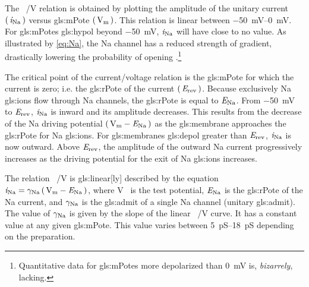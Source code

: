 \documentclass[class={myRUCProject}, crop=false]{standalone}
\begin{document}
The \unit[per-mode = symbol]{\ucur\sodium\per\V} relation is obtained by plotting the amplitude of the unitary current \(\left(\,\mathit{i}_\mathrm{Na}\,\right)\) versus \gls{gls:mPote} \(\br{\unit{\V\membrane}}\). This relation is linear between \qtyrange{-50}{0}{\mV}. For \glspl{gls:mPote} \gls{gls:hypol} beyond \qty{-50}{\mV}, \(\mathit{i}_\mathrm{Na}\) will have close to no value. As illustrated by \cref{eq:Na}, the \gls{Na} channel has a reduced strength of gradient, drastically lowering the probability of opening \cite{Hammond2015ch4}.\footnote{Quantitative data for \glspl{gls:mPote} more depolarized than \qty{0}{\mV} is, \emph{bizarrely}, lacking.}

The critical point of the current/voltage relation is the \gls{gls:mPote} for which the current is zero; i.e. the \gls{gls:rPote} of the current \(\left(\,\mathit{E}_\mathrm{rev}\,\right)\). 
Because exclusively \gls{Na} \glspl{gls:ion} flow through \gls{Na} channels, the \gls{gls:rPote} is equal to \(\mathit{E}_\mathrm{Na}\). 
From \qty{-50}{\mV} to \(\mathit{E}_\mathrm{rev}\), \(\mathit{i}_\mathrm{Na}\) is inward and its amplitude decreases. This results from the decrease of the \gls{Na} driving potential \(\br{\unit{\V\membrane}-\equi\sodium}\) as the \gls{gls:membrane} approaches the \gls{gls:rPote} for \gls{Na} \glspl{gls:ion}. 
For \glspl{gls:membrane} \gls{gls:depol} greater than \(\mathit{E}_\mathrm{rev}\), \(\mathit{i}_\mathrm{Na}\) is now outward. Above \(\mathit{E}_\mathrm{rev}\), the amplitude of the outward \gls{Na} current progressively increases as the driving potential for the exit of \gls{Na} \glspl{gls:ion} increases. 

The relation \unit[per-mode = symbol]{\ucur\sodium\per\V} is \gls{gls:linear}[ly] described by the equation \(\ucur\sodium = \ucon\sodium \br{\unit{\V\membrane}-\equi\sodium}\), where \unit{\V\membrane} is the test potential, \(\mathit{E}_\mathrm{Na}\) is the \gls{gls:rPote} of the \gls{Na} current, and \(\gamma_\mathrm{Na}\) is the \gls{gls:admit} of a single \gls{Na} channel (unitary \gls{gls:admit}). The value of \(\gamma_\mathrm{Na}\) is given by the slope of the linear \unit[per-mode = symbol]{\ucur\sodium\per\V} curve. It has a constant value at any given \gls{gls:mPote}. This value varies between \qtyrange{5}{18}{\pico\siemens} depending on the preparation.

\end{document}
